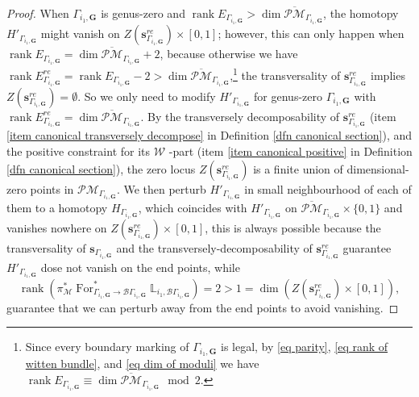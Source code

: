 \documentclass[11pt]{amsart}
\theoremstyle{definition}
\theoremstyle{remark}
\newcommand{\oPMb}{{\overline{\mathcal{PM}}}}
\newcommand{\<}{\left<}
\renewcommand{\>}{\right>}
\numberwithin{equation}{section}
\DeclareMathOperator{\rk}{rank}
\begin{document}
\begin{proof}
        When $\Gamma_{i_1,\bm{G}}$ is genus-zero and $\rk E_{\Gamma_{i_1,\bm{G}}}> \dim \oPMb_{\Gamma_{i_1,\bm{G}}}$, the homotopy $H'_{\Gamma_{i_1,\bm{G}}}$ might vanish on $Z\left(\bm{s}^{re}_{\Gamma_{i_1,\bm{G}}}\right)\times [0,1]$; however, this can only happen when  $\rk E_{\Gamma_{i_1,\bm{G}}}= \dim \oPMb_{\Gamma_{i_1,\bm{G}}}+2$, because otherwise we have  $\rk E^{re}_{\Gamma_{i_1,\bm{G}}}= \rk E_{\Gamma_{i_1,\bm{G}}}-2> \dim \oPMb_{\Gamma_{i_1,\bm{G}}}$,\footnote{Since every boundary marking of $\Gamma_{i_1,\bm{G}}$ is legal,  %
by \eqref{eq parity}, \eqref{eq rank of witten bundle}, and %
\eqref{eq dim of moduli} we have $\rk E_{\Gamma_{i_1,\bm{G}}}\equiv \dim \oPMb_{\Gamma_{i_1,\bm{G}}} \mod 2$.} the transversality of $\bm{s}^{re}_{\Gamma_{i_1,\bm{G}}}$ implies $Z\left(\bm{s}^{re}_{\Gamma_{i_1,\bm{G}}}\right)=\emptyset$. So we only need to modify $H'_{\Gamma_{i_1,\bm{G}}}$ for genus-zero $\Gamma_{i_1,\bm{G}}$ with $\rk E^{re}_{\Gamma_{i_1,\bm{G}}}= \dim \oPMb_{\Gamma_{i_1,\bm{G}}}$. By the transversely decomposability of %
$\bm{s}^{re}_{\Gamma_{i_1,\bm{G}}}$ (item \ref{item canonical transversely decompose} in Definition \ref{dfn canonical section}), and %
the positive constraint for its $\mathcal W$%
-part (item \ref{item canonical positive} in Definition \ref{dfn canonical section}), the %
zero locus $Z\left(\bm{s}^{re}_{\Gamma_{i_1,\bm{G}}}\right)$ is a finite union of dimensional-zero points in $\mathcal{PM}_{\Gamma_{i_1,\bm{G}}}$. We then perturb $H'_{\Gamma_{i_1,\bm{G}}}$ in small neighbourhood of each of them to a homotopy $H_{\Gamma_{i_1,\bm{G}}}$, which coincides with $H'_{\Gamma_{i_1,\bm{G}}}$ on  $\oPMb_{\Gamma_{i_1,\bm{G}}}\times \{0,1\}$ and vanishes nowhere on $Z\left(\bm{s}^{re}_{\Gamma_{i_1,\bm{G}}}\right)\times [0,1]$, this is always possible because the transversality of $\bm{s}_{\Gamma_{i_1,\bm{G}}}$ and the transversely-decomposability of $\bm{s}^{re}_{\Gamma_{i_1,\bm{G}}}$ guarantee $H'_{\Gamma_{i_1,\bm{G}}}$ dose not vanish on the end points, while
        $$\rk \left(\pi^*_{\mathcal M} \operatorname{For}^*_{\Gamma_{i_1,\bm{G}}\to \mathcal B \Gamma_{i_1,\bm{G}}}\mathbb L_{i_1,\mathcal B \Gamma_{i_1,\bm{G}}}\right)=2>1=\dim \left(Z\left(\bm{s}^{re}_{\Gamma_{i_1,\bm{G}}}\right)\times [0,1]\right),$$
        guarantee that we can perturb away from the end points to avoid vanishing.
        

\end{proof}
\end{document}
